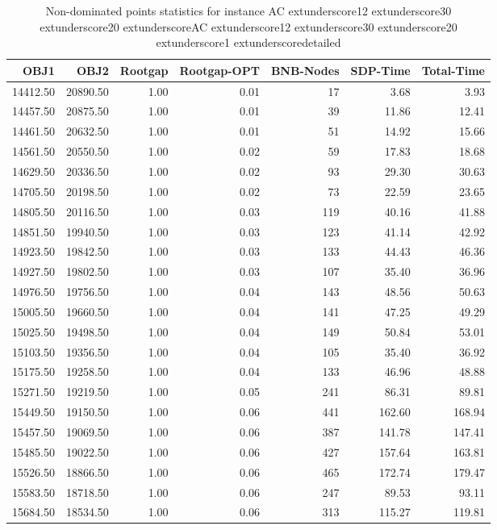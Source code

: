 \begin{table}
\caption{Non-dominated points statistics for instance AC	extunderscore12	extunderscore30	extunderscore20	extunderscoreAC	extunderscore12	extunderscore30	extunderscore20	extunderscore1	extunderscoredetailed}
\label{tab:stats/AC_12_30_20_AC_12_30_20_1_detailed}
\begin{tabular}{rrrrrrr}
\toprule
OBJ1 & OBJ2 & Rootgap & Rootgap-OPT & BNB-Nodes & SDP-Time & Total-Time \\
\midrule
14412.50 & 20890.50 & 1.00 & 0.01 & 17 & 3.68 & 3.93 \\
14457.50 & 20875.50 & 1.00 & 0.01 & 39 & 11.86 & 12.41 \\
14461.50 & 20632.50 & 1.00 & 0.01 & 51 & 14.92 & 15.66 \\
14561.50 & 20550.50 & 1.00 & 0.02 & 59 & 17.83 & 18.68 \\
14629.50 & 20336.50 & 1.00 & 0.02 & 93 & 29.30 & 30.63 \\
14705.50 & 20198.50 & 1.00 & 0.02 & 73 & 22.59 & 23.65 \\
14805.50 & 20116.50 & 1.00 & 0.03 & 119 & 40.16 & 41.88 \\
14851.50 & 19940.50 & 1.00 & 0.03 & 123 & 41.14 & 42.92 \\
14923.50 & 19842.50 & 1.00 & 0.03 & 133 & 44.43 & 46.36 \\
14927.50 & 19802.50 & 1.00 & 0.03 & 107 & 35.40 & 36.96 \\
14976.50 & 19756.50 & 1.00 & 0.04 & 143 & 48.56 & 50.63 \\
15005.50 & 19660.50 & 1.00 & 0.04 & 141 & 47.25 & 49.29 \\
15025.50 & 19498.50 & 1.00 & 0.04 & 149 & 50.84 & 53.01 \\
15103.50 & 19356.50 & 1.00 & 0.04 & 105 & 35.40 & 36.92 \\
15175.50 & 19258.50 & 1.00 & 0.04 & 133 & 46.96 & 48.88 \\
15271.50 & 19219.50 & 1.00 & 0.05 & 241 & 86.31 & 89.81 \\
15449.50 & 19150.50 & 1.00 & 0.06 & 441 & 162.60 & 168.94 \\
15457.50 & 19069.50 & 1.00 & 0.06 & 387 & 141.78 & 147.41 \\
15485.50 & 19022.50 & 1.00 & 0.06 & 427 & 157.64 & 163.81 \\
15526.50 & 18866.50 & 1.00 & 0.06 & 465 & 172.74 & 179.47 \\
15583.50 & 18718.50 & 1.00 & 0.06 & 247 & 89.53 & 93.11 \\
15684.50 & 18534.50 & 1.00 & 0.06 & 313 & 115.27 & 119.81 \\

\end{tabular}
\end{table}
